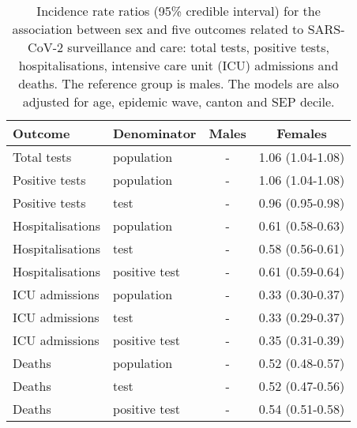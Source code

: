 \documentclass{article}
\begin{document}
	
	\begin{table}[H]
		\centering
		\caption{Incidence rate ratios (95\% credible interval) for the association between sex and five outcomes related to SARS-CoV-2 surveillance and care: total tests, positive tests, hospitalisations, intensive care unit (ICU) admissions and deaths. The reference group is males. The models are also adjusted for age, epidemic wave, canton and SEP decile.}
		\label{tab:cov-sex}
		\medskip
		\begin{tabular}{llcc}
			\hline
			Outcome & Denominator & Males & Females \\ 
			\hline
			Total tests & population & - & 1.06 (1.04-1.08) \\ 
			Positive tests & population & - & 1.06 (1.04-1.08) \\ 
			Positive tests & test & - & 0.96 (0.95-0.98) \\ 
			Hospitalisations & population & - & 0.61 (0.58-0.63) \\ 
			Hospitalisations & test & - & 0.58 (0.56-0.61) \\ 
			Hospitalisations & positive test & - & 0.61 (0.59-0.64) \\ 
			ICU admissions & population & - & 0.33 (0.30-0.37) \\ 
			ICU admissions & test & - & 0.33 (0.29-0.37) \\ 
			ICU admissions & positive test & - & 0.35 (0.31-0.39) \\ 
			Deaths & population & - & 0.52 (0.48-0.57) \\ 
			Deaths & test & - & 0.52 (0.47-0.56) \\ 
			Deaths & positive test & - & 0.54 (0.51-0.58) \\ 
			\hline
		\end{tabular}
	\end{table}
	
\end{document}
